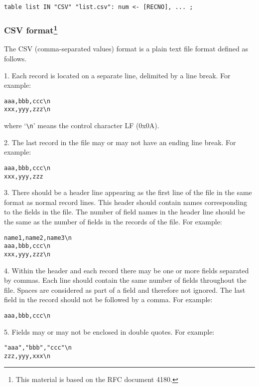 \documentclass[11pt,draft]{article}
\begin{document}
\begin{verbatim}
table list IN "CSV" "list.csv": num <- [RECNO], ... ;
\end{verbatim}

\subsubsection*{CSV format\footnote{This material is based on the RFC
document 4180.}}

The CSV (comma-separated values) format is a plain text file format
defined as follows.

1. Each record is located on a separate line, delimited by a line
break. For example:

\begin{verbatim}
aaa,bbb,ccc\n
xxx,yyy,zzz\n
\end{verbatim}

\noindent
where `\verb|\n|' means the control character LF (0x0A).

\pagebreak

2. The last record in the file may or may not have an ending line
break. For example:

\begin{verbatim}
aaa,bbb,ccc\n
xxx,yyy,zzz
\end{verbatim}

3. There should be a header line appearing as the first line of the
file in the same format as normal record lines. This header should
contain names corresponding to the fields in the file. The number of
field names in the header line should be the same as the number of
fields in the records of the file. For example:

\begin{verbatim}
name1,name2,name3\n
aaa,bbb,ccc\n
xxx,yyy,zzz\n
\end{verbatim}

4. Within the header and each record there may be one or more fields
separated by commas. Each line should contain the same number of
fields throughout the file. Spaces are considered as part of a field
and therefore not ignored. The last field in the record should not
be followed by a comma. For example:

\begin{verbatim}
aaa,bbb,ccc\n
\end{verbatim}

5. Fields may or may not be enclosed in double quotes. For example:

\begin{verbatim}
"aaa","bbb","ccc"\n
zzz,yyy,xxx\n
\end{verbatim}
\end{document}
